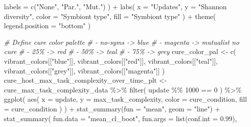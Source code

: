 \documentclass[
]{book}
\newenvironment{Shaded}{\begin{snugshade}}{\end{snugshade}}
\newcommand{\AttributeTok}[1]{\textcolor[rgb]{0.77,0.63,0.00}{#1}}
\newcommand{\CommentTok}[1]{\textcolor[rgb]{0.56,0.35,0.01}{\textit{#1}}}
\newcommand{\DecValTok}[1]{\textcolor[rgb]{0.00,0.00,0.81}{#1}}
\newcommand{\FloatTok}[1]{\textcolor[rgb]{0.00,0.00,0.81}{#1}}
\newcommand{\FunctionTok}[1]{\textcolor[rgb]{0.00,0.00,0.00}{#1}}
\newcommand{\NormalTok}[1]{#1}
\newcommand{\OtherTok}[1]{\textcolor[rgb]{0.56,0.35,0.01}{#1}}
\newcommand{\SpecialCharTok}[1]{\textcolor[rgb]{0.00,0.00,0.00}{#1}}
\newcommand{\StringTok}[1]{\textcolor[rgb]{0.31,0.60,0.02}{#1}}
\begin{document}
\begin{Shaded}
\begin{Highlighting}[]
    \AttributeTok{labels =} \FunctionTok{c}\NormalTok{(}\StringTok{"None"}\NormalTok{, }\StringTok{"Par."}\NormalTok{, }\StringTok{"Mut."}\NormalTok{)}
\NormalTok{  ) }\SpecialCharTok{+}
  \FunctionTok{labs}\NormalTok{(}
    \AttributeTok{x =} \StringTok{"Updates"}\NormalTok{,}
    \AttributeTok{y =} \StringTok{"Shannon diversity"}\NormalTok{,}
    \AttributeTok{color =} \StringTok{"Symbiont type"}\NormalTok{,}
    \AttributeTok{fill =} \StringTok{"Symbiont type"}
\NormalTok{  ) }\SpecialCharTok{+}
  \FunctionTok{theme}\NormalTok{(}
    \AttributeTok{legend.position =} \StringTok{"bottom"}
\NormalTok{  )}
\end{Highlighting}
\end{Shaded}

\begin{Shaded}
\begin{Highlighting}[]
\CommentTok{\# Define cure color palette}
\CommentTok{\# {-} no{-}syms {-}\textgreater{} blue}
\CommentTok{\# {-} magenta {-}\textgreater{} mutualist no cure}
\CommentTok{\# {-} 25\% {-}\textgreater{} red}
\CommentTok{\# {-} 50\% {-}\textgreater{} teal}
\CommentTok{\# {-} 75\% {-}\textgreater{} grey}
\NormalTok{cure\_color\_pal }\OtherTok{\textless{}{-}} \FunctionTok{c}\NormalTok{(}
\NormalTok{  vibrant\_colors[[}\StringTok{"blue"}\NormalTok{]],}
\NormalTok{  vibrant\_colors[[}\StringTok{"red"}\NormalTok{]],}
\NormalTok{  vibrant\_colors[[}\StringTok{"teal"}\NormalTok{]],}
\NormalTok{  vibrant\_colors[[}\StringTok{"grey"}\NormalTok{]],}
\NormalTok{  vibrant\_colors[[}\StringTok{"magenta"}\NormalTok{]]}
\NormalTok{)}
\NormalTok{cure\_host\_max\_task\_complexity\_over\_time\_plt }\OtherTok{\textless{}{-}}\NormalTok{ cure\_max\_task\_complexity\_data }\SpecialCharTok{\%\textgreater{}\%}
  \FunctionTok{filter}\NormalTok{(}
\NormalTok{    update }\SpecialCharTok{\%\%} \DecValTok{1000} \SpecialCharTok{==} \DecValTok{0}
\NormalTok{  ) }\SpecialCharTok{\%\textgreater{}\%}
  \FunctionTok{ggplot}\NormalTok{(}
    \FunctionTok{aes}\NormalTok{(}
      \AttributeTok{x =}\NormalTok{ update,}
      \AttributeTok{y =}\NormalTok{ max\_task\_complexity,}
      \AttributeTok{color =}\NormalTok{ cure\_condition,}
      \AttributeTok{fill =}\NormalTok{ cure\_condition}
\NormalTok{    )}
\NormalTok{  ) }\SpecialCharTok{+}
  \FunctionTok{stat\_summary}\NormalTok{(}\AttributeTok{fun =} \StringTok{"mean"}\NormalTok{, }\AttributeTok{geom =} \StringTok{"line"}\NormalTok{) }\SpecialCharTok{+}
  \FunctionTok{stat\_summary}\NormalTok{(}
    \AttributeTok{fun.data =} \StringTok{"mean\_cl\_boot"}\NormalTok{,}
    \AttributeTok{fun.args =} \FunctionTok{list}\NormalTok{(}\AttributeTok{conf.int =} \FloatTok{0.99}\NormalTok{),}

\end{Highlighting}
\end{Shaded}
\end{document}
